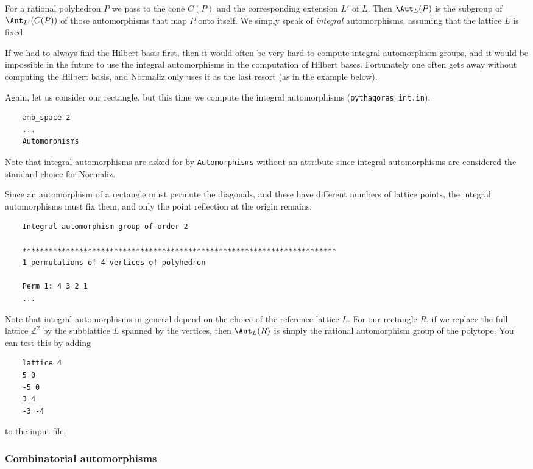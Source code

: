 \documentclass[12pt,a4paper]{scrartcl}
\theoremstyle{definition}
\def\ZZ{{\mathbb Z}}
\begin{document}
{	For a rational polyhedron $P$ we pass to the cone $C(P)$ and the corresponding extension $L'$ of $L$. Then $\Aut_L(P)$ is the subgroup of $\Aut_{L'}(C(P))$ of those automorphisms that map $P$ onto itself. We simply speak of \emph{integral} automorphisms, assuming that the lattice $L$ is fixed. 
	
	If we had to always find the Hilbert basis first, then it would often be very hard to compute integral automorphism groups, and it would be impossible in the future to use the integral automorphisms in the computation of Hilbert bases. Fortunately one often gets away without computing the Hilbert basis, and Normaliz only uses it as the last resort (as in the example below).
	
	Again, let us consider our rectangle, but this time we compute the integral automorphisms (\verb|pythagoras_int.in|). 
	\begin{Verbatim}
	amb_space 2
	...
	Automorphisms
	\end{Verbatim}
	Note that integral automorphisms are asked for by \verb|Automorphisms| without an attribute since integral automorphisms are considered the standard choice for Normaliz.
	
	Since an automorphism of a rectangle must permute the diagonals, and these have different numbers of lattice points, the integral automorphisms must fix them, and only the point reflection at the origin remains:
	\begin{Verbatim}
	Integral automorphism group of order 2
	
	************************************************************************
	1 permutations of 4 vertices of polyhedron
	
	Perm 1: 4 3 2 1
	...
	\end{Verbatim}
	
	Note that integral automorphisms in general depend on the choice of the reference lattice $L$. For our rectangle $R$, if we replace the full lattice $\ZZ^2$ by the subblattice $L$ spanned by the vertices, then $\Aut_L(R)$ is simply the rational automorphism group of the polytope. You can test this by adding
	\begin{Verbatim}
	lattice 4
	5 0
	-5 0
	3 4
	-3 -4
	\end{Verbatim}
	to the input file.
	
	\subsubsection{Combinatorial automorphisms} 
	
}
\end{document}
